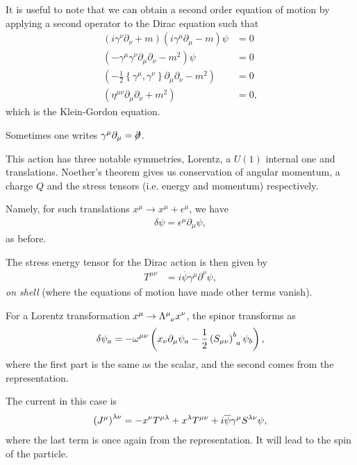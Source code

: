 It is useful to note that we can obtain a second order equation of motion by applying a second operator to the Dirac equation such that
\begin{align}
    \left( i \gamma^{\nu} \partial_\nu  + m \right) \left( i \gamma^{\mu} \partial_\mu - m \right)  \psi &= 0 \\
    \left( - \gamma^{\mu} \gamma^{\nu} \partial_\mu \partial_\nu - m^2 \right) \psi &= 0 \\
    \left(-\frac{1}{2} \left\{ \gamma^{\mu}, \gamma^{\nu} \right\} \partial_\mu \partial_\nu - m^2  \right)  &= 0 \\
    \left( \eta^{\mu \nu} \partial_\mu \partial_\nu + m^2  \right)  &= 0 
,\end{align}
which is the Klein-Gordon equation.

\begin{note}
    Sometimes one writes $\gamma^{\mu} \partial_\mu =  \fbs{\partial}$.
\end{note}

This action has three notable symmetries, Lorentz, a $U \left( 1 \right) $ internal one and translations. Noether's theorem gives us conservation of angular momentum, a charge $Q$ and the stress tensors (i.e. energy and momentum) respectively.

Namely, for such translations $x^{\mu} \to x^{\mu} + \epsilon^{\mu}$, we have
\begin{align}
    \delta\psi = \epsilon^{\mu} \partial_\mu \psi
,\end{align}
as before.

The stress energy tensor for the Dirac action is then given by
\begin{align}
    T^{\mu \nu} &= i\overline{\psi} \gamma^{\mu} \partial^{\nu} \psi 
,\end{align}
\emph{on shell} (where the equations of motion have made other terms vanish).

For a Lorentz transformation $x^{\mu} \to \tensor{\Lambda}{^{\mu}_{\nu}} x^{\nu}$, the spinor transforms as
\begin{align}
    \delta \psi_a = -\omega^{\mu \nu} \left( x_\nu \partial_\mu \psi_a - \frac{1}{2} \tensor{\left( S_{\mu \nu} \right)}{^{b}_a} \psi_b \right) 
,\end{align}
where the first part is the same as the scalar, and the second comes from the representation.

The current in this case is
\begin{align}
    \tensor{\left( J^{\mu} \right) }{^{\lambda \nu}} = - x^{\nu} T^{\mu \lambda} + x^{\lambda} T^{\mu \nu} + i \overline{\psi}\gamma^{\mu} S^{\lambda \nu} \psi
,\end{align}
where the last term is once again from the representation. It will lead to the spin of the particle.

